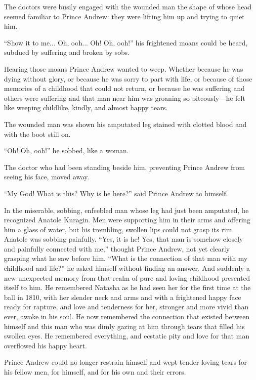 The doctors were busily engaged with the wounded man the shape of
whose head seemed familiar to Prince Andrew: they were lifting
him up and trying to quiet him.

``Show it to me... Oh, ooh... Oh! Oh, ooh!'' his frightened moans
could be heard, subdued by suffering and broken by sobs.

Hearing those moans Prince Andrew wanted to weep. Whether because
he was dying without glory, or because he was sorry to part with
life, or because of those memories of a childhood that could not
return, or because he was suffering and others were suffering and
that man near him was groaning so piteously---he felt like
weeping childlike, kindly, and almost happy tears.

The wounded man was shown his amputated leg stained with clotted
blood and with the boot still on.

``Oh! Oh, ooh!'' he sobbed, like a woman.

The doctor who had been standing beside him, preventing Prince
Andrew from seeing his face, moved away.

``My God! What is this? Why is he here?'' said Prince Andrew to
himself.

In the miserable, sobbing, enfeebled man whose leg had just been
amputated, he recognized Anatole Kuragin. Men were supporting him
in their arms and offering him a glass of water, but his
trembling, swollen lips could not grasp its rim. Anatole was
sobbing painfully. ``Yes, it is he! Yes, that man is somehow
closely and painfully connected with me,'' thought Prince Andrew,
not yet clearly grasping what he saw before him.  ``What is the
connection of that man with my childhood and life?'' he asked
himself without finding an answer. And suddenly a new unexpected
memory from that realm of pure and loving childhood presented
itself to him. He remembered Natasha as he had seen her for the
first time at the ball in 1810, with her slender neck and arms
and with a frightened happy face ready for rapture, and love and
tenderness for her, stronger and more vivid than ever, awoke in
his soul. He now remembered the connection that existed between
himself and this man who was dimly gazing at him through tears
that filled his swollen eyes. He remembered everything, and
ecstatic pity and love for that man overflowed his happy heart.

Prince Andrew could no longer restrain himself and wept tender
loving tears for his fellow men, for himself, and for his own and
their errors.

